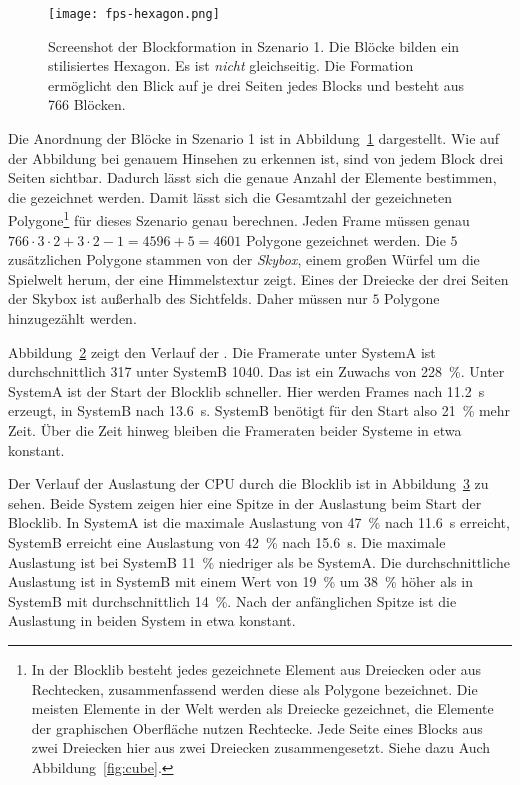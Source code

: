 \begin{figure}
	\centering
	\texttt{[image: fps-hexagon.png]}
	\caption{Screenshot der Blockformation in Szenario 1. Die Blöcke bilden ein stilisiertes Hexagon. Es ist \emph{nicht} gleichseitig. Die Formation ermöglicht den Blick auf je drei Seiten jedes Blocks und besteht aus 766 Blöcken.}\label{fig:hexagon}
\end{figure}
Die Anordnung der Blöcke in Szenario 1 ist in Abbildung~\ref{fig:hexagon} dargestellt. Wie auf der Abbildung bei genauem Hinsehen zu erkennen ist, sind von jedem Block drei Seiten sichtbar. Dadurch lässt sich die genaue Anzahl der Elemente bestimmen, die gezeichnet werden. Damit lässt sich die Gesamtzahl der gezeichneten Polygone\footnote{In der Blocklib besteht jedes gezeichnete Element aus Dreiecken oder aus Rechtecken, zusammenfassend werden diese als Polygone bezeichnet. Die meisten Elemente in der Welt werden als Dreiecke gezeichnet, die Elemente der graphischen Oberfläche nutzen Rechtecke. Jede Seite eines Blocks aus zwei Dreiecken hier aus zwei Dreiecken zusammengesetzt. Siehe dazu Auch Abbildung~\ref{fig:cube}.} für dieses Szenario genau berechnen. Jeden Frame müssen genau $766\cdot3\cdot2 + 3\cdot2-1 = 4596 +5 = 4601$ Polygone gezeichnet werden. Die $5$ zusätzlichen Polygone stammen von der \emph{Skybox}, einem großen Würfel um die Spielwelt herum, der eine Himmelstextur zeigt. Eines der Dreiecke der drei Seiten der Skybox ist außerhalb des Sichtfelds. Daher müssen nur $5$ Polygone hinzugezählt werden.

\begin{figure}[!htbp]
	\caption{}\label{fig:seed-0-hexagon-fps}
\end{figure}
Abbildung~\ref{fig:seed-0-hexagon-fps} zeigt den Verlauf der \si{\fps}. Die Framerate unter SystemA ist durchschnittlich \SI{317}{\fps} unter SystemB \SI{1040}{\fps}. Das ist ein Zuwachs von \SI{228}{\percent}. Unter SystemA ist der Start der Blocklib schneller. Hier werden Frames nach \SI{11,2}{\second} erzeugt, in SystemB nach \SI{13,6}{\second}. SystemB benötigt für den Start also \SI{21}{\percent} mehr Zeit. Über die Zeit hinweg bleiben die Frameraten beider Systeme in etwa konstant.


\begin{figure}[!htbp]
	\caption{}\label{fig:seed-0-hexagon-cpu}
\end{figure}
Der Verlauf der Auslastung der CPU durch die Blocklib ist in Abbildung~\ref{fig:seed-0-hexagon-cpu} zu sehen. Beide System zeigen hier eine Spitze in der Auslastung beim Start der Blocklib. In SystemA ist die maximale Auslastung von \SI{47}{\percent} nach \SI{11,6}{\second} erreicht, SystemB erreicht eine Auslastung von \SI{42}{\percent} nach \SI{15,6}{\second}. Die maximale Auslastung ist bei SystemB \SI{11}{\percent} niedriger als be SystemA. Die durchschnittliche Auslastung ist in SystemB mit einem Wert von \SI{19}{\percent} um \SI{38}{\percent} höher als in SystemB mit durchschnittlich \SI{14}{\percent}. Nach der anfänglichen Spitze ist die Auslastung in beiden System in etwa konstant.

